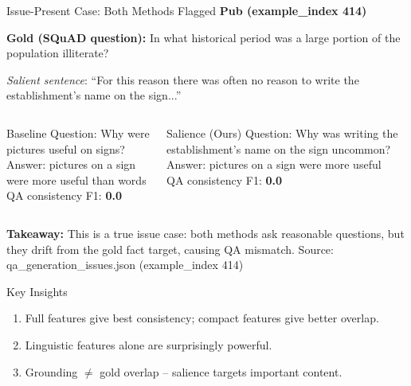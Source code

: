 \documentclass[aspectratio=169]{beamer}
\begin{document}
\begin{frame}{Issue-Present Case: Both Methods Flagged}
\small
\textbf{Pub (example\_index 414)}

\scriptsize \textbf{Gold (SQuAD question):} In what historical period was a large portion of the population illiterate?

\vspace{0.25em}
\scriptsize \textit{Salient sentence}: ``For this reason there was often no reason to write the establishment's name on the sign...''

\vspace{0.3em}
\begin{columns}[T,onlytextwidth]
\begin{block}{Baseline}
Question: Why were pictures useful on signs? \\
Answer: pictures on a sign were more useful than words \\
QA consistency F1: \textbf{0.0}
\end{block}

\begin{alertblock}{Salience (Ours)}
Question: Why was writing the establishment's name on the sign uncommon? \\
Answer: pictures on a sign were more useful \\
QA consistency F1: \textbf{0.0}
\end{alertblock}
\end{columns}

\vspace{0.25em}
\textbf{Takeaway:} This is a true issue case: both methods ask reasonable questions, but they drift from the gold fact target, causing QA mismatch.
\scriptsize Source: qa\_generation\_issues.json (example\_index 414)
\end{frame}

\begin{frame}{Key Insights}
\small
\begin{enumerate}
  \item Full features give best consistency; compact features give better overlap.
  \item Linguistic features alone are surprisingly powerful.
  \item Grounding \(\neq\) gold overlap -- salience targets important content.
\end{enumerate}
\end{frame}
\end{document}
